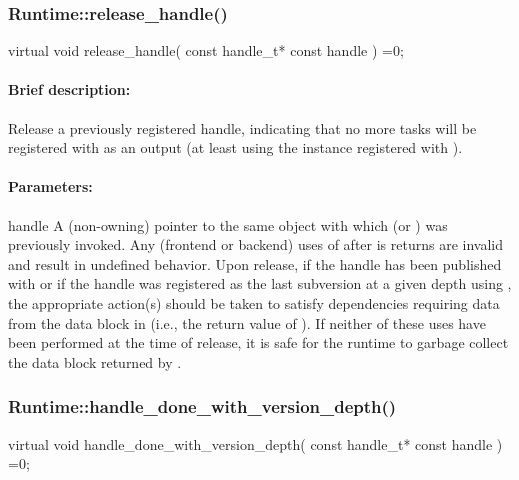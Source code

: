 \subsubsection{Runtime::release\_handle()}
\begin{CppCode}
    virtual void
    release_handle(
      const handle_t* const handle
    ) =0;
\end{CppCode}

\paragraph{Brief description:} Release a previously registered handle, indicating that no more tasks will be registered
       with  as an output (at least using the instance registered with ).
     
\paragraph{Parameters:} 
\begin{compactdesc}
\item[handle] A (non-owning) pointer to the same object with which  (or
       ) was previously invoked.  Any (frontend or backend) uses of 
       after  is returns are invalid and result in undefined behavior.  Upon release,
       if the handle has been published with  or if the handle was registered
       as the last subversion at a given depth using , the
       appropriate action(s) should be taken to satisfy dependencies requiring data from the data block
       in  (i.e., the return value of ).  If neither of these uses have
       been performed at the time of release, it is safe for the runtime to garbage collect the data block
       returned by .
\end{compactdesc}


\subsubsection{Runtime::handle\_done\_with\_version\_depth()}
\begin{CppCode}
    virtual void
    handle_done_with_version_depth(
      const handle_t* const handle
    ) =0;
\end{CppCode}

